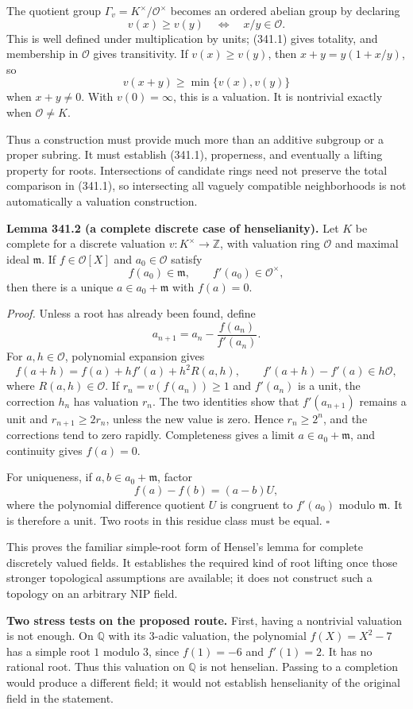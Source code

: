 \documentclass[11pt]{article}
\begin{document}
The quotient group $\Gamma_v=K^\times/\mathcal O^\times$ becomes an ordered abelian group by declaring
\[
 v(x)\geq v(y)\quad\Longleftrightarrow\quad x/y\in\mathcal O.
\]
This is well defined under multiplication by units; (341.1) gives totality, and membership in $\mathcal O$ gives transitivity. If $v(x)\geq v(y)$, then $x+y=y(1+x/y)$, so
\[
 v(x+y)\geq\min\{v(x),v(y)\}
\]
when $x+y\ne0$. With $v(0)=\infty$, this is a valuation. It is nontrivial exactly when $\mathcal O\ne K$.

Thus a construction must provide much more than an additive subgroup or a proper subring. It must establish (341.1), properness, and eventually a lifting property for roots. Intersections of candidate rings need not preserve the total comparison in (341.1), so intersecting all vaguely compatible neighborhoods is not automatically a valuation construction.

\textbf{Lemma 341.2 (a complete discrete case of henselianity).} Let $K$ be complete for a discrete valuation $v:K^\times\to\mathbb Z$, with valuation ring $\mathcal O$ and maximal ideal $\mathfrak m$. If $f\in\mathcal O[X]$ and $a_0\in\mathcal O$ satisfy
\[
 f(a_0)\in\mathfrak m,\qquad f'(a_0)\in\mathcal O^\times,
\]
then there is a unique $a\in a_0+\mathfrak m$ with $f(a)=0$.

\emph{Proof.} Unless a root has already been found, define
\[
 a_{n+1}=a_n-\frac{f(a_n)}{f'(a_n)}.
\]
For $a,h\in\mathcal O$, polynomial expansion gives
\[
 f(a+h)=f(a)+hf'(a)+h^2R(a,h),\qquad
 f'(a+h)-f'(a)\in h\mathcal O,
\]
where $R(a,h)\in\mathcal O$. If $r_n=v(f(a_n))\geq1$ and $f'(a_n)$ is a unit, the correction $h_n$ has valuation $r_n$. The two identities show that $f'(a_{n+1})$ remains a unit and $r_{n+1}\geq2r_n$, unless the new value is zero. Hence $r_n\geq2^n$, and the corrections tend to zero rapidly. Completeness gives a limit $a\in a_0+\mathfrak m$, and continuity gives $f(a)=0$.

For uniqueness, if $a,b\in a_0+\mathfrak m$, factor
\[
 f(a)-f(b)=(a-b)U,
\]
where the polynomial difference quotient $U$ is congruent to $f'(a_0)$ modulo $\mathfrak m$. It is therefore a unit. Two roots in this residue class must be equal. $\square$

This proves the familiar simple-root form of Hensel's lemma for complete discretely valued fields. It establishes the required kind of root lifting once those stronger topological assumptions are available; it does not construct such a topology on an arbitrary NIP field.

\textbf{Two stress tests on the proposed route.} First, having a nontrivial valuation is not enough. On $\mathbb Q$ with its $3$-adic valuation, the polynomial $f(X)=X^2-7$ has a simple root $1$ modulo $3$, since $f(1)=-6$ and $f'(1)=2$. It has no rational root. Thus this valuation on $\mathbb Q$ is not henselian. Passing to a completion would produce a different field; it would not establish henselianity of the original field in the statement.
\end{document}
